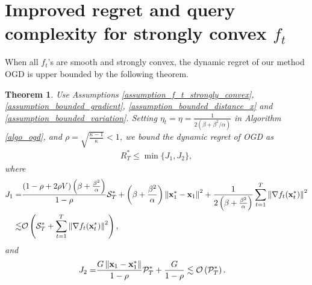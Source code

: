\documentclass{article}
\newtheorem{Theorem}{\bf{Theorem}}
\begin{document}
\section{Improved regret and query complexity for strongly convex $f_t$} 
\label{sect_dynamic_regret_strongly_convex}


When all $f_t$'s are smooth and strongly convex, the dynamic regret of our method OGD is upper bounded by the following theorem.
\begin{Theorem}
\label{theorem_s_sc_regret}
Use Assumptions \ref{assumption_f_t_strongly_convex}, \ref{assumption_bounded_gradient}, \ref{assumption_bounded_distance_x} and \ref{assumption_bounded_variation}. Setting  $\eta_t = \eta = \frac{1}{2(\beta+\beta^2/\alpha)}$ in Algorithm \ref{algo_ogd}, and $\rho = \sqrt{\frac{\kappa - 1}{\kappa}} < 1$, we bound the dynamic regret of OGD as
\begin{align}
\nonumber     
R_T^{\ast} \le \min \{J_1, J_2\}, 
\end{align} where 
\begin{align}
\nonumber
J_1 = & \frac{(1-\rho + 2\rho V)\left(  \beta + \frac{\beta^2}{\alpha}  \right)}{1-\rho} {\mathcal{S}}_T^{\ast}   + \left(  \beta + \frac{\beta^2}{\alpha}  \right)\left\lVert{\bf x}_1^{\ast} - {\bf x}_1\right\rVert^2   + \frac{1}{ 2\left(  \beta + \frac{\beta^2}{\alpha}  \right) }\sum\limits_{t=1}^{T} \left\lVert\nabla f_t({\bf x}_t^{\ast})\right\rVert^2 \\ \nonumber
\lesssim & {\mathcal{O}}\left(  {\mathcal{S}}_T^{\ast} + \sum\limits_{t=1}^{T} \left\lVert\nabla f_t({\bf x}_t^{\ast})\right\rVert^2  \right),
\end{align} and 
\begin{align}
\nonumber
J_2 = & \frac{G\left\lVert{\bf x}_1-{\bf x}_1^{\ast}\right\rVert}{1-\rho} {\mathcal{P}}_T^{\ast} + \frac{G}{1-\rho} \lesssim  {\mathcal{O}}\left(  {\mathcal{P}}_T^{\ast}  \right).
\end{align}

\end{Theorem} 
\end{document}
